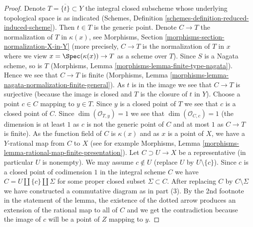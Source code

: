 \begin{proof}
\medskip\noindent
Denote $T = \overline{\{t\}} \subset Y$ the integral closed subscheme
whose underlying topological space is as indicated
(Schemes, Definition \ref{schemes-definition-reduced-induced-scheme}).
Then $t \in T$ is the generic point.
Denote $C \to T$ the normalization of $T$ in $\kappa(x)$, see
Morphisms, Section \ref{morphisms-section-normalization-X-in-Y}
(more precisely, $C \to T$ is the normalization of $T$ in $x$
where we view $x = \Spec(\kappa(x)) \to T$ as a scheme over $T$).
Since $S$ is a Nagata scheme, so is $T$
(Morphisms, Lemma \ref{morphisms-lemma-finite-type-nagata}).
Hence we see that $C \to T$ is finite
(Morphisms, Lemma \ref{morphisms-lemma-nagata-normalization-finite-general}).
As $t$ is in the image we see that $C \to T$ is surjective (because
the image is closed and $T$ is the closure of $t$ in $Y$).
Choose a point $c \in C$ mapping to $y \in T$.
Since $y$ is a closed point of $T$ we see that $c$ is
a closed point of $C$. Since $\dim(\mathcal{O}_{T, y}) = 1$
we see that $\dim(\mathcal{O}_{C, c}) = 1$ (the dimension is
at least $1$ as $c$ is not the generic point of $C$ and
at most $1$ as $C \to T$ is finite).
As the function field of $C$ is $\kappa(x)$ and as $x$
is a point of $X$, we have a $Y$-rational map from $C$ to $X$
(see for example Morphisms, Lemma
\ref{morphisms-lemma-rational-map-finite-presentation}).
Let $C \supset U \to X$ be a representative (in particular $U$ is nonempty).
We may assume $c \not \in U$ (replace $U$ by $U \setminus \{c\}$).
Since $c$ is a closed point of codimension $1$ in the integral scheme $C$
we have $C = U \amalg \{c\} \amalg \Sigma$
for some proper closed subset $\Sigma \subset C$.
After replacing $C$ by $C \setminus \Sigma$
we have constructed a commutative diagram as in part (3).
By the 2nd footnote in the statement of the lemma,
the existence of the dotted arrow produces an extension
of the rational map to all of $C$ and we get the contradiction
because the image of $c$ will be a point of $Z$ mapping to $y$.
\end{proof}

